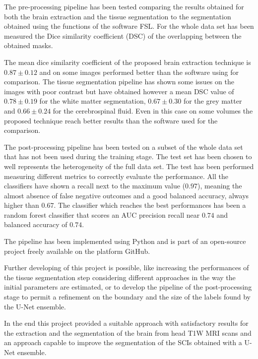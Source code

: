 \documentclass{standalone}
\begin{document}
The pre-processing pipeline has been tested comparing the results obtained for both the brain extraction and the tissue segmentation to the segmentation obtained using the functions of the software FSL. 
For the whole data set has been measured the Dice similarity coefficient (DSC) of the overlapping between the obtained masks.

The mean dice similarity coefficient of the proposed brain extraction technique is $0.87 \pm 0.12$ and on some images performed better than the software using for comparison.
The tissue segmentation pipeline has shown some issues on the images with poor contrast but have obtained however a mean DSC value of $0.78 \pm 0.19$ for the white matter segmentation, $0.67 \pm 0.30$ for the grey matter and $0.66 \pm 0.24$ for the cerebrospinal fluid.
Even in this case on some volumes the proposed technique reach better results than the software used for the comparison.

The post-processing pipeline has been tested on a subset of the whole data set that has not been used during the training stage. The test set has been chosen to well represents the heterogeneity of the full data set.
The test has been performed measuring different metrics to correctly evaluate the performance. All the classifiers have shown a recall next to the maximum value ($0.97$), meaning the almost absence of false negative outcomes and a good balanced accuracy, always higher than $0.67$.
The classifier which reaches the best performances has been a random forest classifier that scores an AUC precision recall near $0.74$ and balanced accuracy of $0.74$.

The pipeline has been implemented using Python and is part of an open-source project freely available on the platform GitHub.

Further developing of this project is possible, like increasing the performances of the tissue segmentation step considering different approaches in the way the initial parameters are estimated, or to develop the pipeline of the post-processing stage to permit a refinement on the boundary and the size of the labels found by the U-Net ensemble.

In the end this project provided a suitable approach with satisfactory results for the extraction and the segmentation of the brain from head T1W MRI scans and an approach capable to improve the segmentation of the SCIs obtained with a U-Net ensemble.
\end{document}

